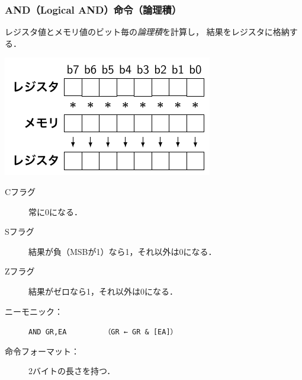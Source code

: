 \documentclass{beamer}                 %
\begin{document}
\begin{frame}
  \frametitle{AND（Logical AND）命令（論理積）}
  \begin{minipage}{0.48\columnwidth}
  レジスタ値とメモリ値のビット毎の\emph{論理積}を計算し，
  結果をレジスタに格納する．
  \end{minipage}
  \begin{minipage}{0.48\columnwidth}
  \centerline{\includegraphics[scale=0.8]{../Tikz/land.pdf}}
  \end{minipage}
  \vfill
  \begin{description}
  \item[Cフラグ] 常に0になる．
  \item[Sフラグ] 結果が負（MSBが1）なら1，それ以外は0になる．
  \item[Zフラグ] 結果がゼロなら1，それ以外は0になる．
    \vfill
  \item[ニーモニック：]\texttt{AND GR,EA}~~~~~~~~~\texttt{（GR ← GR \& [EA]）}
    \vfill
  \item[命令フォーマット：] 2バイトの長さを持つ．\\
    {\small{}}
  \end{description}
  \vfill
\end{frame}
\end{document}
